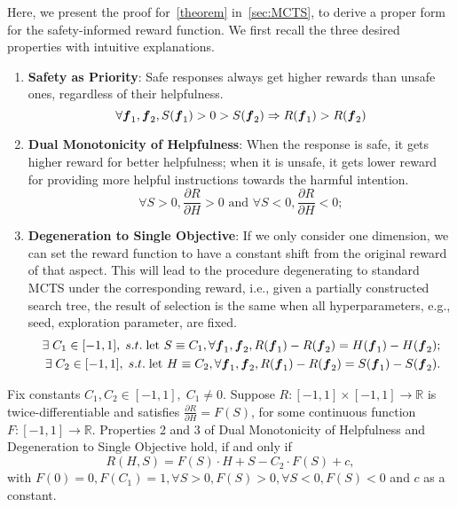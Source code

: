Here, we present the proof for~\cref{theorem} in~\cref{sec:MCTS}, to derive a proper form for the safety-informed reward function. We first recall the three desired properties with intuitive explanations.
\begin{enumerate}
    \item \textbf{Safety as Priority}: Safe responses always get higher rewards than unsafe ones, regardless of their helpfulness.
    \begin{equation}
        \forall \boldsymbol{f}_1,\boldsymbol{f}_2, S(\boldsymbol{f}_1)>0> S(\boldsymbol{f}_2) \Rightarrow R(\boldsymbol{f}_1)>R(\boldsymbol{f}_2)
    \end{equation}
    \item \textbf{Dual Monotonicity of Helpfulness}: When the response is safe, it gets higher reward for better helpfulness; when it is unsafe, it gets lower reward for providing more helpful instructions towards the harmful intention.
    \begin{equation}
        \forall S>0 , \frac{\partial R}{\partial H} > 0\text{ and } \forall S<0, \frac{\partial R}{\partial H} < 0;
    \end{equation}
    \item \textbf{Degeneration to Single Objective}: If we only consider one dimension, we can set the reward function to have a constant shift from the original reward of that aspect. This will lead to the procedure degenerating to standard MCTS under the corresponding reward, i.e., given a partially constructed search tree, the result of selection is the same when all hyperparameters, e.g., seed, exploration parameter, are fixed.
    \begin{align}
        \exists\;C_1 \in [-1,1],\;s.t.\;\text{let }S\equiv C_1, \forall \boldsymbol{f}_1,\boldsymbol{f}_2, R(\boldsymbol{f}_1)-R(\boldsymbol{f}_2)=H(\boldsymbol{f}_1)-H(\boldsymbol{f}_2);\\
    \exists\;C_2 \in [-1,1],\;s.t.\;\text{let }H\equiv C_2, \forall \boldsymbol{f}_1,\boldsymbol{f}_2, R(\boldsymbol{f}_1)-R(\boldsymbol{f}_2)=S(\boldsymbol{f}_1)-S(\boldsymbol{f}_2).
    \end{align}
    
\end{enumerate}

\begin{theorem}
    Fix constants $C_1, C_2\in [-1,1],\;C_1\ne0$. Suppose $R:[-1,1]\times[-1,1]\rightarrow \mathbb{R}$ is twice-differentiable and satisfies $\frac{\partial R}{\partial H}=F(S)$, for some continuous function $F: [-1,1]\rightarrow \mathbb{R}$. Properties 2 and 3 of Dual Monotonicity of Helpfulness and Degeneration to Single Objective hold, if and only if
    \begin{equation}
    R(H,S)=F(S)\cdot H+S - C_2 \cdot F(S)+c,       
    \end{equation} with $F(0)=0, F(C_1)=1, \forall S>0, F(S)>0, \forall S<0, F(S)<0$ and $c$ as a constant.
\end{theorem}

